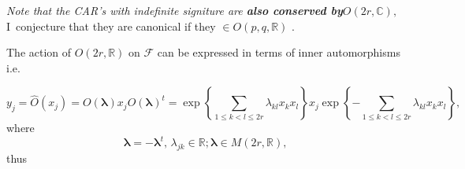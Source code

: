 \documentclass[aps, preprint]{revtex4}
\begin{document}
\emph{Note that the CAR's with indefinite signiture are \textbf{also conserved by}}$O \left (2 r ,\mathbb{C}\right )\text{,}$ I\ conjecture that they are canonical if they $ \in O \left (p ,q ,\mathbb{R}\right )$ $\text{.}$ 

The action of $O \left (2 r ,\mathbb{R}\right )$ on $\mathcal{F}$ can be expressed in terms of inner automorphisms i.e. 

\begin{equation}y_{j} =\hat{O} \left (x_{j}\right ) =O \left (\mathbf{\lambda }\right ) x_{j} O \left (\mathbf{\lambda }\right )^{t} =\exp  \left \{\sum _{1 \leq k <l \leq 2 r}\lambda _{k l} x_{k} x_{l}\right \} x_{j} \exp  \left \{ -\sum _{1 \leq k <l \leq 2 r}\lambda _{k l} x_{k} x_{l}\right \}\text{,}
\end{equation}where
\begin{equation}\mathbf{\lambda }  = -\mathbf{\lambda }^{t} ,\,\lambda _{j k} \in \mathbb{R} ;\mathbf{\lambda } \in M \left (2 r ,\mathbb{R}\right )\text{,}
\end{equation}thus
\end{document}
